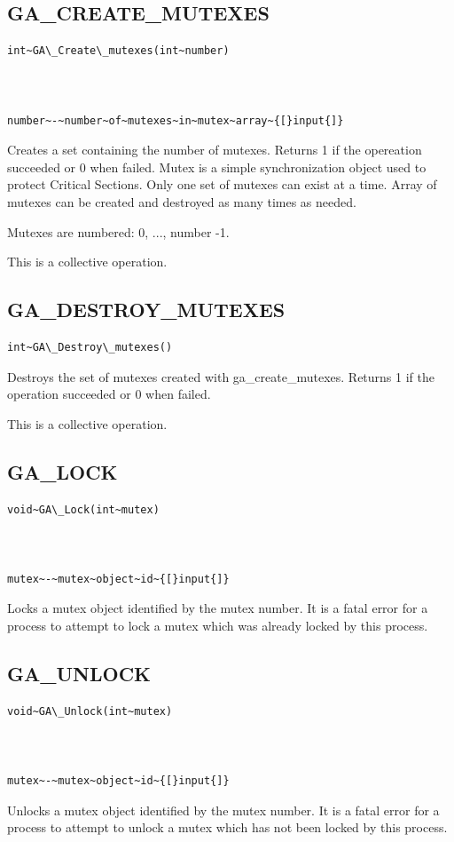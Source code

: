 \subsection*{\label{sub:GA_CREATE_MUTEXES}GA\_CREATE\_MUTEXES}
\begin{verbatim}
int~GA\_Create\_mutexes(int~number)



number~-~number~of~mutexes~in~mutex~array~{[}input{]}
\end{verbatim}
Creates a set containing the number of mutexes. Returns 1 if the opereation
succeeded or 0 when failed. Mutex is a simple synchronization object
used to protect Critical Sections. Only one set of mutexes can exist
at a time. Array of mutexes can be created and destroyed as many times
as needed.

Mutexes are numbered: 0, ..., number -1.

This is a collective operation. 


\subsection*{GA\_DESTROY\_MUTEXES}
\begin{verbatim}
int~GA\_Destroy\_mutexes()
\end{verbatim}
Destroys the set of mutexes created with ga\_create\_mutexes. Returns
1 if the operation succeeded or 0 when failed.

This is a collective operation. 


\subsection*{GA\_LOCK}
\begin{verbatim}
void~GA\_Lock(int~mutex)



mutex~-~mutex~object~id~{[}input{]}
\end{verbatim}
Locks a mutex object identified by the mutex number. It is a fatal
error for a process to attempt to lock a mutex which was already locked
by this process. 


\subsection*{GA\_UNLOCK}
\begin{verbatim}
void~GA\_Unlock(int~mutex)



mutex~-~mutex~object~id~{[}input{]}
\end{verbatim}
Unlocks a mutex object identified by the mutex number. It is a fatal
error for a process to attempt to unlock a mutex which has not been
locked by this process. 


